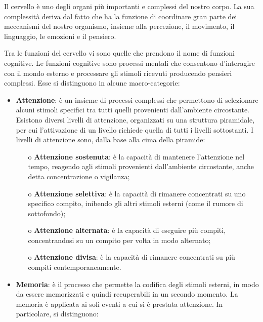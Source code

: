 Il cervello è uno degli organi più importanti e complessi del nostro corpo. La
sua complessità deriva dal fatto che ha la funzione di coordinare gran parte
dei meccanismi del nostro organismo, insieme alla percezione, il movimento, il
linguaggio, le emozioni e il pensiero.

Tra le funzioni del cervello vi sono quelle che prendono il nome di funzioni
cognitive. Le funzioni cognitive sono processi mentali che consentono
d'interagire con il mondo esterno e processare gli stimoli ricevuti producendo
pensieri complessi. Esse si distinguono in alcune macro-categorie:
\begin{itemize}
  \item \textbf{Attenzione}: è un insieme di processi complessi che
        permettono di selezionare alcuni stimoli specifici tra tutti quelli
        provenienti dall’ambiente circostante. Esistono diversi livelli di
        attenzione, organizzati su una struttura piramidale, per cui
        l’attivazione di un livello richiede quella di tutti i livelli
        sottostanti. I livelli di attenzione sono, dalla base alla cima della
        piramide:
        \begin{itemize}
          \item[o] \textbf{Attenzione sostenuta}: è la capacità di mantenere
                l’attenzione nel tempo, reagendo agli stimoli provenienti
                dall'ambiente circostante, anche detta concentrazione o
                vigilanza;
          \item[o] \textbf{Attenzione selettiva}: è la capacità di rimanere
                concentrati su uno specifico compito, inibendo gli altri
                stimoli esterni (come il rumore di sottofondo);
          \item[o] \textbf{Attenzione alternata}: è la capacità di eseguire più
                compiti, concentrandosi su un compito per volta in modo
                alternato;
          \item[o] \textbf{Attenzione divisa}: è la capacità di rimanere
                concentrati su più compiti contemporaneamente.
        \end{itemize}
  \item \textbf{Memoria}: è il processo che permette la codifica degli
        stimoli esterni, in modo da essere memorizzati e quindi recuperabili in
        un secondo momento. La memoria è applicata ai soli eventi a cui si è
        prestata attenzione. In particolare, si distinguono:
        \begin{itemize}

\end{itemize}
\end{itemize}
